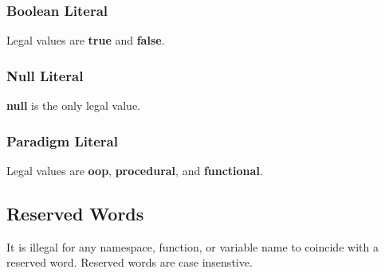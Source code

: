 \documentclass[hidelinks]{article}
\begin{document}
\subsubsection{Boolean Literal}
Legal values are \textbf{true} and \textbf{false}.

\subsubsection{Null Literal}
\textbf{null} is the only legal value.

\subsubsection{Paradigm Literal}
Legal values are \textbf{oop}, \textbf{procedural}, and \textbf{functional}.
\subsection{Reserved Words}
It is illegal for any namespace, function, or variable name to coincide with a reserved word. Reserved words are case insenstive.
\end{document}
